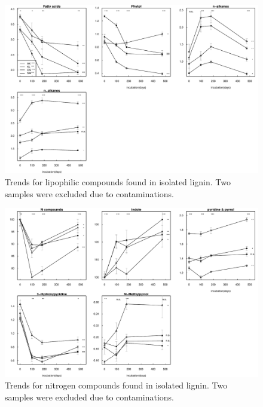 \documentclass[preprint,review,12pt]{elsarticle}
\begin{document}
\newpage
\begin{figure}[h!]
\vspace*{2mm}
\begin{center}

\includegraphics{aap-notlignin}
\end{center}
\caption{Trends for lipophilic compounds found in isolated lignin. Two samples were excluded due to contaminations.}
\label{fig:notlig}
\end{figure}

\newpage
\begin{figure}[h!]
\vspace*{2mm}
\begin{center}

\includegraphics{aap-ncomp}
\end{center}
\caption{Trends for nitrogen compounds found in isolated lignin. Two samples were excluded due to contaminations.}
\label{fig:npeaks}
\end{figure}
\end{document}
